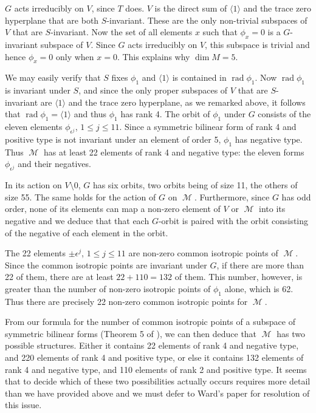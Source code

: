\documentclass{amsart}
\DeclareMathOperator{\M}{\mathcal{M}}
\DeclareMathOperator{\rad}{rad}
\theoremstyle{plain}
\theoremstyle{definition}
\begin{document}
$G$ acts irreducibly on $V$, since $T$ does. $V$ is the direct sum of $\langle 1\rangle$ and the trace zero hyperplane that are both
$S$-invariant. These are the only non-trivial subspaces of $V$ that are $S$-invariant. Now the set of all elements $x$ such that $\phi_x=0$ is a
$G$-invariant subspace of $V$. Since $G$ acts irreducibly on $V$, this subspace is trivial and hence $\phi_x=0$ only when $x=0$. This explains
why $\dim M=5$.

We may easily verify that $S$ fixes $\phi_1$ and $\langle 1\rangle$ is contained in $\rad \phi_1$. Now $\rad \phi_1$ is invariant under $S$, and since the only proper subspaces of $V$ that are $S$-invariant are $\langle 1\rangle$ and the trace zero hyperplane, as we remarked above, it follows that $\rad \phi_1=\langle 1\rangle$ and thus $\phi_1$ has rank 4. The orbit of $\phi_1$ under $G$ consists of the eleven
elements $\phi_{\epsilon^j}$, $1\leq j\leq 11$. Since a symmetric bilinear form of rank 4 and positive type is not invariant
under an element of order 5, $\phi_1$ has negative type. Thus $\M$ has at least 22 elements of rank 4 and negative type: the eleven forms
$\phi_{\epsilon^j}$ and their negatives.

In its action on $V\setminus 0$, $G$ has six orbits, two orbits being of size 11, the others of size 55. The same holds for the action of
$G$ on $\M$. Furthermore, since $G$ has odd order, none of its elements can map a non-zero element of $V$ or $\M$ into its negative and 
we deduce that that each $G$-orbit is paired with the orbit consisting of the negative of each element in the orbit. 

The 22 elements $\pm \epsilon^j$, $1\leq j\leq 11$ are non-zero common isotropic points of $\M$. Since the common isotropic points are invariant under $G$, if there are more than 22 of them, there are at least $22+110=132$ of them. This number, however, is greater than the number of non-zero  
isotropic points of
$\phi_1$ alone, which is 62. Thus there are precisely 22 non-zero common isotropic points for $\M$.

From our formula for the number of common isotropic points of a subspace of symmetric bilinear forms (Theorem 5 of \cite{DGS}), we can then deduce
that $\M$ has two possible structures. Either it contains 22 elements of rank 4 and negative type, and 220 elements of rank 4 and positive type, or else it contains 132 elements of rank 4 and negative type, and 110 elements of rank 2 and positive type. It seems that to decide which of these two possibilities actually occurs requires more detail than we have provided above and we must defer to Ward's paper for resolution of this issue.
\end{document}
